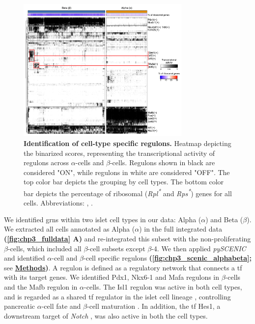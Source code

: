 \begin{figure}
\vspace{-20pt}
\includegraphics[width=8.5cm]{Chapter5/Fig/F3-11-01.png}
\caption[Identification of cell-type specific regulons]{\textbf{Identification of cell-type specific regulons.} Heatmap depicting the binarized  scores, representing the transcriptional activity of regulons across $\alpha$-cells and $\beta$-cells. Regulons shown in black are considered "ON", while regulons in white are considered "OFF". The top color bar depicts the grouping by cell types. The bottom color bar depicts the percentage of ribosomal (\textit{Rpl\textsuperscript{*}} and \textit{Rps\textsuperscript{*}}) genes for all cells. Abbreviations: , .}
\vspace{-pt}
\label{fig:chp3_scenic_alphabeta}
\end{figure}


\par We identified \glspl{grn} within two islet cell types in our data: Alpha ($\alpha$) and Beta ($\beta$). We extracted all cells annotated as Alpha ($\alpha$) in the full integrated data \textbf{(\autoref{fig:chp3_fulldata} A)} and re-integrated this subset with the non-proliferating $\beta$-cells, which included all $\beta$-cell subsets except $\beta$-4. We then applied \textit{pySCENIC} and identified $\alpha$-cell and $\beta$-cell specific regulons \textbf{(\autoref{fig:chp3_scenic_alphabeta};} see \hyperref[subsubsec:met_chp3_scenic]{\textbf{Methods}}\textbf{)}. A regulon is defined as a regulatory network that connects a \gls{tf} with its target genes. We identified Pdx1, Nkx6-1 and Mafa regulons in $\beta$-cells and the Mafb regulon in $\alpha$-cells. The Isl1 regulon was active in both cell types, and is regarded as a shared \gls{tf} regulator in the islet cell lineage \textbf{\cite{juhl_mouse_2008}}, controlling pancreatic $\alpha$-cell fate and $\beta$-cell maturation \textbf{\cite{bohuslavova_isl1_2023}}. In addition, the \gls{tf} Hes1, a downstream target of \textit{Notch} \textbf{\cite{hashemitabar_redefining_2019}}, was also active in both the cell types.\\



